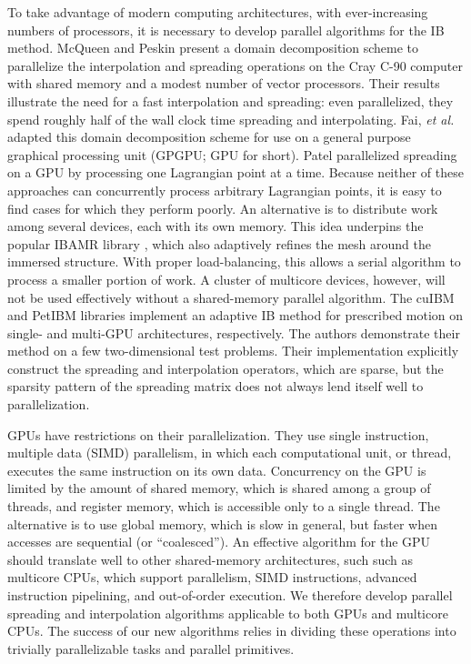 To take advantage of modern computing architectures, with ever-increasing numbers of
processors, it is necessary to develop parallel algorithms for the IB method.
McQueen and Peskin \cite{McQueen:1997kw} present a domain decomposition scheme to
parallelize the interpolation and spreading operations on the Cray C-90 computer with
shared memory and a modest number of vector processors. Their results illustrate the need
for a fast interpolation and spreading: even parallelized, they spend roughly half of the
wall clock time spreading and interpolating. Fai, \textit{et al.} \cite{Fai:2013do}
adapted this domain decomposition scheme for use on a general purpose graphical
processing unit (GPGPU; GPU for short). Patel \cite{Patel:2012tc} parallelized spreading
on a GPU by processing one Lagrangian point at a time. Because neither of these
approaches can concurrently process arbitrary Lagrangian points, it is easy to find cases
for which they perform poorly. An alternative is to distribute work among several
devices, each with its own memory. This idea underpins the popular IBAMR library
\cite{Griffith:2007uk,Griffith:2007do,Griffith:2009gg, Griffith:2011gi, Griffith:2017id},
which also adaptively refines the mesh around the immersed structure. With proper
load-balancing, this allows a serial algorithm to process a smaller portion of work.
A cluster of multicore devices, however, will not be used effectively without a
shared-memory parallel algorithm. The cuIBM \cite{Layton:2011um} and PetIBM
\cite{Mesnard:2017te,Chuang:2018ej} libraries implement an adaptive IB method for
prescribed motion on single- and multi-GPU architectures, respectively. The authors
demonstrate their method on a few two-dimensional test problems. Their implementation
explicitly construct the spreading and interpolation operators, which are sparse, but the
sparsity pattern of the spreading matrix does not always lend itself well to
parallelization.

GPUs have restrictions on their parallelization. They use single instruction,
multiple data (SIMD) parallelism, in which each computational unit, or thread, executes
the same instruction on its own data. Concurrency on the GPU is limited by the amount of
shared memory, which is shared among a group of threads, and register memory, which is
accessible only to a single thread. The alternative is to use global memory, which is
slow in general, but faster when accesses are sequential (or ``coalesced''). An effective
algorithm for the GPU should translate well to other shared-memory architectures, such
such as multicore CPUs, which support parallelism, SIMD instructions, advanced
instruction pipelining, and out-of-order execution. We therefore develop parallel
spreading and interpolation algorithms applicable to both GPUs and multicore CPUs. The
success of our new algorithms relies in dividing these operations into trivially
parallelizable tasks and parallel primitives.

